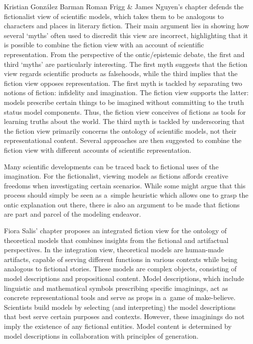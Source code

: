 \begin{recengenv}{Kristian González Barman}
Roman Frigg \& James Nguyen's chapter defends the fictionalist view of scientific models, which takes them to be analogous to characters and places in literary fiction. Their main argument lies in showing how several ‘myths' often used to discredit this view are incorrect, highlighting that it is possible to combine the fiction view with an account of scientific representation. From the perspective of the ontic/epistemic debate, the first and third ‘myths' are particularly interesting. The first myth suggests that the fiction view regards scientific products as falsehoods, while the third implies that the fiction view opposes representation. The first myth is tackled by separating two notions of fiction: infidelity and imagination. The fiction view supports the latter: models prescribe certain things to be imagined without committing to the truth status model components. Thus, the fiction view conceives of fictions as tools for learning truths about the world. The third myth is tackled by underscoring that the fiction view primarily concerns the ontology of scientific models, not their representational content. Several approaches are then suggested to combine the fiction view with different accounts of scientific representation.

Many scientific developments can be traced back to fictional uses of the imagination. For the fictionalist, viewing models as fictions affords creative freedoms when investigating certain scenarios. While some might argue that this process should simply be seen as a~simple heuristic which allows one to grasp the ontic explanation out there, there is also an argument to be made that fictions are part and parcel of the modeling endeavor.

Fiora Salis' chapter proposes an integrated fiction view for the ontology of theoretical models that combines insights from the fictional and artifactual perspectives. In the integration view, theoretical models are human-made artifacts, capable of serving different functions in various contexts while being analogous to fictional stories. These models are complex objects, consisting of model descriptions and propositional content. Model descriptions, which include linguistic and mathematical symbols prescribing specific imaginings, act as concrete representational tools and serve as props in a~game of make-believe. Scientists build models by selecting (and interpreting) the model descriptions that best serve certain purposes and contexts. However, these imaginings do not imply the existence of any fictional entities. Model content is determined by model descriptions in collaboration with principles of generation.


\end{recengenv}
